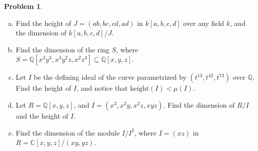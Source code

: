 \documentclass[11pt]{article}
\theoremstyle{definition}
\newtheorem{problem}{Problem}
\begin{document}
\begin{problem}$\,$
	\begin{enumerate}[a)]
		\item Find the height of $J = (ab,bc,cd,ad)$ in $k[a,b,c,d]$ over any field $k$, and the dimension of $k[a,b,c,d]/J$.
		\item Find the dimension of the ring $S$, where $S = \mathbb{Q}[x^3y^3, x^3y^2z, x^2z^3] \subseteq \mathbb{Q}[x,y,z]$.
		\item Let $I$ be the defining ideal of the curve parametrized by $(t^{13},t^{42},t^{73})$ over $\mathbb{Q}$. Find the height of $I$, and notice that $\textrm{height}(I) < \mu(I)$.
		\item Let $R=\mathbb{Q}[x,y,z]$, and $I=(x^3, x^2y, x^2z, xyz)$. Find the dimension of $R/I$ and the height of $I$.
		\item Find the dimension of the module $I/I^2$, where $I = (xz)$ in $R = \mathbb{C}[x,y,z]/(xy,yz)$.	
	\end{enumerate}
\end{problem}
\end{document}
